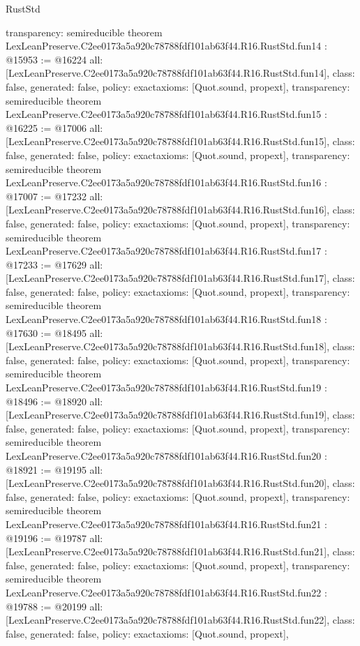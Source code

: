 \begin{lexlean}{RustStd}
\begin{coremodule}
{  transparency: semireducible
}
theorem LexLeanPreserve.C2ee0173a5a920c78788fdf101ab63f44.R16.RustStd.fun14 : @15953 := @16224 {
  all: [LexLeanPreserve.C2ee0173a5a920c78788fdf101ab63f44.R16.RustStd.fun14],
  class: false,
  generated: false,
  policy: exact{axioms: [Quot.sound, propext]},
  transparency: semireducible
}
theorem LexLeanPreserve.C2ee0173a5a920c78788fdf101ab63f44.R16.RustStd.fun15 : @16225 := @17006 {
  all: [LexLeanPreserve.C2ee0173a5a920c78788fdf101ab63f44.R16.RustStd.fun15],
  class: false,
  generated: false,
  policy: exact{axioms: [Quot.sound, propext]},
  transparency: semireducible
}
theorem LexLeanPreserve.C2ee0173a5a920c78788fdf101ab63f44.R16.RustStd.fun16 : @17007 := @17232 {
  all: [LexLeanPreserve.C2ee0173a5a920c78788fdf101ab63f44.R16.RustStd.fun16],
  class: false,
  generated: false,
  policy: exact{axioms: [Quot.sound, propext]},
  transparency: semireducible
}
theorem LexLeanPreserve.C2ee0173a5a920c78788fdf101ab63f44.R16.RustStd.fun17 : @17233 := @17629 {
  all: [LexLeanPreserve.C2ee0173a5a920c78788fdf101ab63f44.R16.RustStd.fun17],
  class: false,
  generated: false,
  policy: exact{axioms: [Quot.sound, propext]},
  transparency: semireducible
}
theorem LexLeanPreserve.C2ee0173a5a920c78788fdf101ab63f44.R16.RustStd.fun18 : @17630 := @18495 {
  all: [LexLeanPreserve.C2ee0173a5a920c78788fdf101ab63f44.R16.RustStd.fun18],
  class: false,
  generated: false,
  policy: exact{axioms: [Quot.sound, propext]},
  transparency: semireducible
}
theorem LexLeanPreserve.C2ee0173a5a920c78788fdf101ab63f44.R16.RustStd.fun19 : @18496 := @18920 {
  all: [LexLeanPreserve.C2ee0173a5a920c78788fdf101ab63f44.R16.RustStd.fun19],
  class: false,
  generated: false,
  policy: exact{axioms: [Quot.sound, propext]},
  transparency: semireducible
}
theorem LexLeanPreserve.C2ee0173a5a920c78788fdf101ab63f44.R16.RustStd.fun20 : @18921 := @19195 {
  all: [LexLeanPreserve.C2ee0173a5a920c78788fdf101ab63f44.R16.RustStd.fun20],
  class: false,
  generated: false,
  policy: exact{axioms: [Quot.sound, propext]},
  transparency: semireducible
}
theorem LexLeanPreserve.C2ee0173a5a920c78788fdf101ab63f44.R16.RustStd.fun21 : @19196 := @19787 {
  all: [LexLeanPreserve.C2ee0173a5a920c78788fdf101ab63f44.R16.RustStd.fun21],
  class: false,
  generated: false,
  policy: exact{axioms: [Quot.sound, propext]},
  transparency: semireducible
}
theorem LexLeanPreserve.C2ee0173a5a920c78788fdf101ab63f44.R16.RustStd.fun22 : @19788 := @20199 {
  all: [LexLeanPreserve.C2ee0173a5a920c78788fdf101ab63f44.R16.RustStd.fun22],
  class: false,
  generated: false,
  policy: exact{axioms: [Quot.sound, propext]},
}
\end{coremodule}
\end{lexlean}
